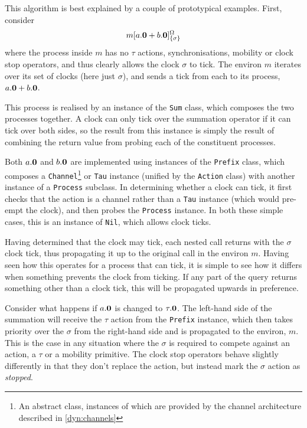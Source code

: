 This algorithm is best explained by a couple of prototypical examples.
First, consider 
\begin{displaymath}
{m}[ a.\textbf{0} + b.\textbf{0} ]^{\Omega}_{\{\sigma\}}
\end{displaymath}
where the process inside $m$ has no $\tau$ actions, synchronisations,
mobility or clock stop operators, and thus clearly allows the clock
$\sigma$ to tick.  The environ $m$ iterates over its set of clocks (here
just $\sigma$), and sends a tick from each to its process, $a.\textbf{0} +
b.\textbf{0}$.

This process is realised by an instance of the \texttt{Sum} class, which
composes the two processes together.  A clock can only tick over the
summation operator if it can tick over both sides, so the result from
this instance is simply the result of combining the return value from
probing each of the constituent processes.

Both $a.\textbf{0}$ and $b.\textbf{0}$ are implemented using instances of the
\texttt{Prefix} class, which composes a \texttt{Channel}\footnote{An
abstract class, instances of which are provided by the channel
architecture described in \ref{dyn:channels}} or \texttt{Tau} instance
(unified by the \texttt{Action} class) with another instance of a
\texttt{Process} subclass.  In determining whether a clock can tick, it
first checks that the action is a channel rather than a \texttt{Tau}
instance (which would pre-empt the clock), and then probes the
\texttt{Process} instance.  In both these simple cases, this is an
instance of \texttt{Nil}, which allows clock ticks.

Having determined that the clock may tick, each nested call returns with
the $\sigma$ clock tick, thus propagating it up to the original call in
the environ $m$.  Having seen how this operates for a process that can
tick, it is simple to see how it differs when something prevents the
clock from ticking.  If any part of the query returns something other
than a clock tick, this will be propagated upwards in preference.

Consider what happens if $a.\textbf{0}$ is changed to $\tau.\textbf{0}$.  The
left-hand side of the summation will receive the $\tau$ action from the
\texttt{Prefix} instance, which then takes priority over the $\sigma$
from the right-hand side and is propagated to the environ, $m$.  This is
the case in any situation where the $\sigma$ is required to compete
against an action, a $\tau$ or a mobility primitive.  The clock stop
operators behave slightly differently in that they don't replace the
action, but instead mark the $\sigma$ action as \emph{stopped}.


